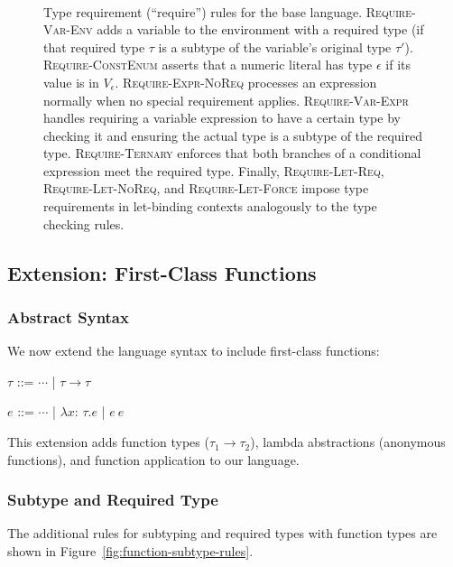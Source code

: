 \documentclass[10pt,conference]{IEEEtran}
\newcommand{\funct}[3]{\ensuremath{\lambda #1\mathsf{:}\,#2.#3}}
\newcommand{\apply}[2]{\ensuremath{#1\ #2}}
\newcommand{\arrowt}[2]{\ensuremath{{#1}\rightarrow{#2}}}
\begin{document}
\begin{figure*}[ht]
\begin{framed}
\begin{align*}
{\begin{array}{c}
\end{array}
}
\end{align*}
\end{framed}
\caption{Type requirement (``require'') rules for the base language. \textsc{Require-Var-Env} adds a variable to the environment with a required type (if that required type $\tau$ is a subtype of the variable's original type $\tau'$). \textsc{Require-ConstEnum} asserts that a numeric literal has type $\epsilon$ if its value is in $V_\epsilon$. \textsc{Require-Expr-NoReq} processes an expression normally when no special requirement applies. \textsc{Require-Var-Expr} handles requiring a variable expression to have a certain type by checking it and ensuring the actual type is a subtype of the required type. \textsc{Require-Ternary} enforces that both branches of a conditional expression meet the required type. Finally, \textsc{Require-Let-Req}, \textsc{Require-Let-NoReq}, and \textsc{Require-Let-Force} impose type requirements in let-binding contexts analogously to the type checking rules.}
\label{fig:type-requiring-rules}
\end{figure*}

\subsection{Extension: First-Class Functions}
\subsubsection{Abstract Syntax}
We now extend the language syntax to include first-class functions:

\vspace{0.5em}
\begin{bnf}
    $\tau$ ::= $\cdots$ | \arrowt{\tau}{\tau}
\end{bnf}

\begin{bnf}
    $e$ ::= $\cdots$ 
    | \funct{x}{\tau}{e} 
    | \apply{e}{e}
\end{bnf}
\vspace{0.5em}

This extension adds function types ($\tau_1 \to \tau_2$), lambda abstractions (anonymous functions), and function application to our language.

\subsubsection{Subtype and Required Type}
The additional rules for subtyping and required types with function types are shown in Figure~\ref{fig:function-subtype-rules}.
\end{document}
